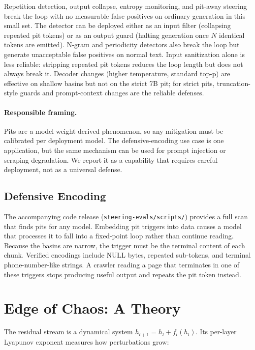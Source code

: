 \documentclass{article}
\begin{document}
Repetition detection, output collapse, entropy monitoring, and pit-away steering
break the loop with no measurable false positives on ordinary generation in this
small set. The detector can be deployed either as an input filter (collapsing
repeated pit tokens) or as an output guard (halting generation once $N$
identical tokens are emitted). N-gram and periodicity detectors also break the
loop but generate unacceptable false positives on normal text. Input
sanitization alone is less reliable: stripping repeated pit tokens reduces the
loop length but does not always break it. Decoder changes (higher temperature,
standard top-p) are effective on shallow basins but not on the strict 7B pit;
for strict pits, truncation-style guards and prompt-context changes are the
reliable defenses.

\paragraph{Responsible framing.} Pits are a model-weight-derived phenomenon, so
any mitigation must be calibrated per deployment model. The defensive-encoding
use case is one application, but the same mechanism can be used for prompt
injection or scraping degradation. We report it as a capability that requires
careful deployment, not as a universal defense.

\subsection{Defensive Encoding}

The accompanying code release (\texttt{steering-evals/scripts/}) provides a
full scan that finds pits for any model. Embedding pit triggers into data causes
a model that processes it to fall into a fixed-point loop rather than continue
reading. Because the basins are narrow, the trigger must be the terminal
content of each chunk. Verified encodings include NULL bytes, repeated
sub-tokens, and terminal phone-number-like strings. A crawler reading a page
that terminates in one of these triggers stops producing useful output and
repeats the pit token instead.

\section{Edge of Chaos: A Theory}

The residual stream is a dynamical system $h_{l+1} = h_l + f_l(h_l)$. Its
per-layer Lyapunov exponent measures how perturbations grow:
\end{document}
